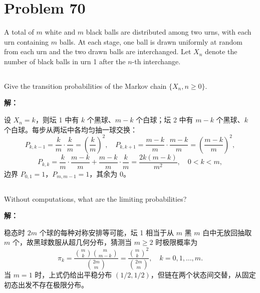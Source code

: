 \documentclass[12pt,a4paper]{article}
\begin{document}
\section*{Problem 70}

A total of $m$ white and $m$ black balls are distributed among two urns, with each urn containing $m$ balls. At each stage, one ball is drawn uniformly at random from each urn and the two drawn balls are interchanged. Let $X_n$ denote the number of black balls in urn 1 after the $n$-th interchange.

\subsection{}

Give the transition probabilities of the Markov chain $\{X_n, n \ge 0\}$.

\begin{answerbox}
\textbf{解：}

设 $X_n=k$，则坛 1 中有 $k$ 个黑球、$m-k$ 个白球；坛 2 中有 $m-k$ 个黑球、$k$ 个白球。每步从两坛中各均匀抽一球交换：
$$
P_{k,k-1}=\frac{k}{m}\cdot\frac{k}{m}=\left(\frac{k}{m}\right)^2, \quad
P_{k,k+1}=\frac{m-k}{m}\cdot\frac{m-k}{m}=\left(\frac{m-k}{m}\right)^2,
$$
$$
P_{k,k}=\frac{k}{m}\cdot\frac{m-k}{m}+\frac{m-k}{m}\cdot\frac{k}{m}=\frac{2k(m-k)}{m^2}, \quad 0<k<m,
$$
边界 $P_{0,1}=1$，$P_{m,m-1}=1$，其余为 $0$。
\end{answerbox}

\subsection{}

Without computations, what are the limiting probabilities?

\begin{answerbox}
\textbf{解：}

稳态时 $2m$ 个球的每种对称安排等可能，坛 1 相当于从 $m$ 黑 $m$ 白中无放回抽取 $m$ 个，故黑球数服从超几何分布，猜测当 $m\geq2$ 时极限概率为
$$
\pi_k=\frac{\binom{m}{k}\binom{m}{m-k}}{\binom{2m}{m}}=\frac{\binom{m}{k}^2}{\binom{2m}{m}}, \quad k=0,1,\ldots,m.
$$
当 $m=1$ 时，上式仍给出平稳分布 $(1/2,1/2)$，但链在两个状态间交替，从固定初态出发不存在极限分布。

\end{answerbox}

\subsection{}
\end{document}
